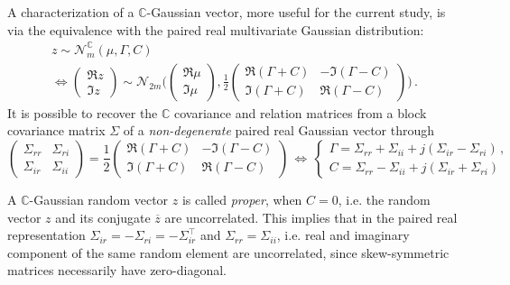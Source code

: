 \documentclass[a4paper,10pt]{article}
\newcommand{\cplx}{\mathbb{C}}
\newcommand{\conj}[1]{\overline{#1}}
\begin{document}
A characterization of a $\cplx$-Gaussian vector, more useful for the current study, is via the
equivalence with the paired real multivariate Gaussian distribution:
\begin{multline}  \label{eq:cn-paired-real-density}
  z \sim \mathcal{N}^{\cplx}_m(\mu, \Gamma, C)
    \\\Leftrightarrow
    \begin{pmatrix}
      \Re z \\ \Im z
    \end{pmatrix}
      \sim \mathcal{N}_{2 m}\biggl(
        \begin{pmatrix}
          \Re \mu \\ \Im \mu
        \end{pmatrix},
        \frac12
        \begin{pmatrix}
          \Re{(\Gamma + C)} & - \Im{(\Gamma - C)} \\
          \Im{(\Gamma + C)} &   \Re{(\Gamma - C)}
        \end{pmatrix}
      \biggr)
    \,.
\end{multline}
It is possible to recover the $\cplx$ covariance and relation matrices from a block covariance
matrix $\Sigma$ of a \textit{non-degenerate} paired real Gaussian vector through
$$
\begin{pmatrix}
  \Sigma_{rr} & \Sigma_{ri} \\ 
  \Sigma_{ir} & \Sigma_{ii} 
\end{pmatrix}
  = \frac12
    \begin{pmatrix}
      \Re{(\Gamma + C)} & - \Im{(\Gamma - C)} \\
      \Im{(\Gamma + C)} &   \Re{(\Gamma - C)}
    \end{pmatrix}
  \, \Leftrightarrow
  \,
  \begin{cases}
    \Gamma
      = \Sigma_{rr} + \Sigma_{ii} + j (\Sigma_{ir} - \Sigma_{ri})
    \,, \\
    C = \Sigma_{rr} - \Sigma_{ii} + j (\Sigma_{ir} + \Sigma_{ri}) 
  \end{cases}
  $$

A $\cplx$-Gaussian random vector $z$ is called \textit{proper}, when $C = 0$, i.e. the random
vector $z$ and its conjugate $\conj{z}$ are uncorrelated. This implies that in the paired real
representation $
  \Sigma_{ir} = -\Sigma_{ri} = -\Sigma_{ir}^\top
$ and $\Sigma_{rr} = \Sigma_{ii}$, i.e. real and imaginary component of the same random element
are uncorrelated, since skew-symmetric matrices necessarily have zero-diagonal.
\end{document}
